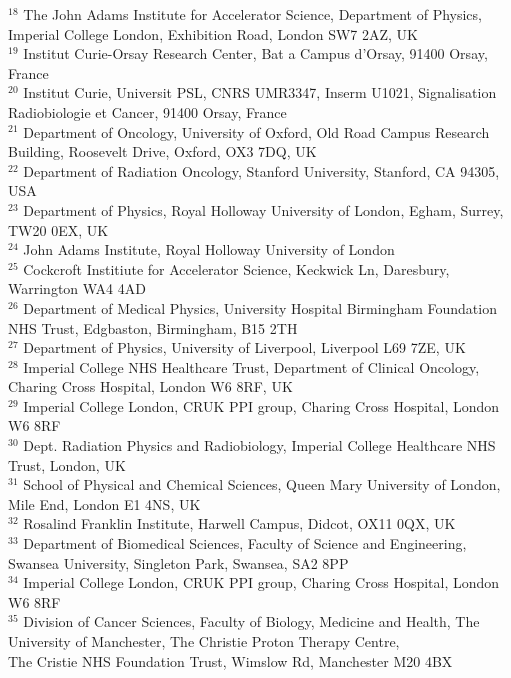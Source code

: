 {\begin{tabbing}
     $^{18}$ \> The John Adams Institute for Accelerator Science, Department of Physics, Imperial College London, Exhibition Road, London SW7 2AZ, UK\\
     $^{19}$ \> Institut Curie-Orsay Research Center, Bat a Campus d'Orsay, 91400 Orsay, France\\
     $^{20}$ \> Institut Curie, Universit PSL, CNRS UMR3347, Inserm U1021, Signalisation Radiobiologie et Cancer, 91400 Orsay, France\\
     $^{21}$ \> Department of Oncology, University of Oxford, Old Road Campus Research Building, Roosevelt Drive, Oxford, OX3 7DQ, UK\\
     $^{22}$ \> Department of Radiation Oncology, Stanford University, Stanford, CA 94305, USA\\
     $^{23}$ \> Department of Physics, Royal Holloway University of London, Egham, Surrey, TW20 0EX, UK\\
     $^{24}$ \> John Adams Institute, Royal Holloway University of London\\
     $^{25}$ \> Cockcroft Institiute for Accelerator Science, Keckwick Ln, Daresbury, Warrington WA4 4AD\\
     $^{26}$ \> Department of Medical Physics, University Hospital Birmingham Foundation NHS Trust, Edgbaston, Birmingham, B15 2TH\\
     $^{27}$ \> Department of Physics, University of Liverpool, Liverpool L69 7ZE, UK\\
     $^{28}$ \> Imperial College NHS Healthcare Trust, Department of Clinical Oncology, Charing Cross Hospital, London W6 8RF, UK\\
     $^{29}$ \> Imperial College London, CRUK PPI group, Charing Cross Hospital, London W6 8RF\\
     $^{30}$ \> Dept. Radiation Physics and Radiobiology, Imperial College Healthcare NHS Trust, London, UK\\
     $^{31}$ \> School of Physical and Chemical Sciences, Queen Mary University of London, Mile End, London E1 4NS, UK\\
     $^{32}$ \> Rosalind Franklin Institute, Harwell Campus, Didcot, OX11 0QX, UK\\
     $^{33}$ \> Department of Biomedical Sciences, Faculty of Science and Engineering, Swansea University, Singleton Park, Swansea, SA2 8PP\\
     $^{34}$ \> Imperial College London, CRUK PPI group, Charing Cross Hospital, London W6 8RF\\
     $^{35}$ \> Division of Cancer Sciences, Faculty of Biology, Medicine and Health, The University of Manchester, The Christie Proton Therapy Centre, \\ \> The Cristie NHS Foundation Trust, Wimslow Rd, Manchester M20 4BX\\

\end{tabbing}}
